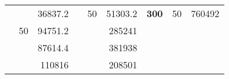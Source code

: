 \begin{table}[H]
\begin{tabular}{|ccrccrccc}
\rowcolor[HTML]{DDFDFF} 
\multicolumn{1}{|c|}{\cellcolor[HTML]{FFFFC7}}                                & \multicolumn{1}{c|}{\cellcolor[HTML]{DDFDFF}}                      & \multicolumn{1}{r|}{\cellcolor[HTML]{DAE8FC}36837.2}   & \multicolumn{1}{c|}{\cellcolor[HTML]{FFFFC7}}                                & \multicolumn{1}{c|}{\multirow{-10}{*}{\cellcolor[HTML]{DDFDFF}50}}  & \multicolumn{1}{r|}{\cellcolor[HTML]{DDFDFF}51303.2}   & \multicolumn{1}{c|}{\multirow{-19}{*}{\cellcolor[HTML]{FFFFC7}\textbf{300}}} & \multicolumn{1}{c|}{\multirow{-10}{*}{\cellcolor[HTML]{DDFDFF}50}} & \multicolumn{1}{r|}{\cellcolor[HTML]{DDFDFF}760492}    \\ \cline{3-3} \cline{5-9} 
\multicolumn{1}{|c|}{\cellcolor[HTML]{FFFFC7}}                                & \multicolumn{1}{c|}{\multirow{-10}{*}{\cellcolor[HTML]{DDFDFF}50}} & \multicolumn{1}{r|}{\cellcolor[HTML]{DDFDFF}94751.2}   & \multicolumn{1}{c|}{\cellcolor[HTML]{FFFFC7}}                                & \multicolumn{1}{c|}{\cellcolor[HTML]{DAE8FC}}                       & \multicolumn{1}{r|}{\cellcolor[HTML]{DAE8FC}285241}    &                                                                              &                                                                    &                                                        \\ \cline{2-3} \cline{6-6}
\multicolumn{1}{|c|}{\cellcolor[HTML]{FFFFC7}}                                & \multicolumn{1}{c|}{\cellcolor[HTML]{DAE8FC}}                      & \multicolumn{1}{r|}{\cellcolor[HTML]{DAE8FC}87614.4}   & \multicolumn{1}{c|}{\cellcolor[HTML]{FFFFC7}}                                & \multicolumn{1}{c|}{\cellcolor[HTML]{DAE8FC}}                       & \multicolumn{1}{r|}{\cellcolor[HTML]{DDFDFF}381938}    &                                                                              &                                                                    &                                                        \\ \cline{3-3} \cline{6-6}
\multicolumn{1}{|c|}{\cellcolor[HTML]{FFFFC7}}                                & \multicolumn{1}{c|}{\cellcolor[HTML]{DAE8FC}}                      & \multicolumn{1}{r|}{\cellcolor[HTML]{DDFDFF}110816}    & \multicolumn{1}{c|}{\cellcolor[HTML]{FFFFC7}}                                & \multicolumn{1}{c|}{\cellcolor[HTML]{DAE8FC}}                       & \multicolumn{1}{r|}{\cellcolor[HTML]{DAE8FC}208501}    &                                                                              &                                                                    &                                                        \\ \cline{3-3} \cline{6-6}

\end{tabular}
\end{table}
